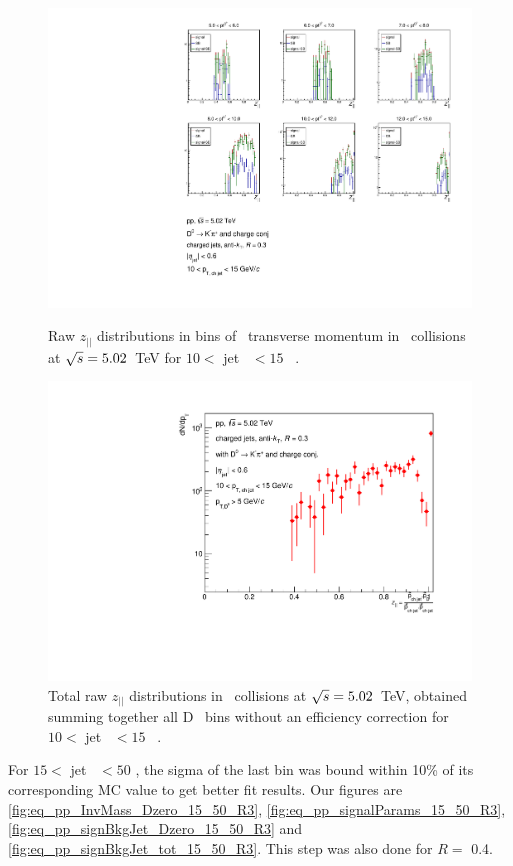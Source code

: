 \begin{figure}[bth]
\centering
\begin{minipage}{.65\textwidth}
  \centering
\includegraphics[width=\textwidth]{pp_2sig/R3_jetbin_10_15/jetRawSpectrum_pTD5}
\caption{Raw $z_{||}$ distributions in bins of \Dzero\ transverse momentum in \pp\ collisions at $\sqrt{s}=5.02$~TeV for $10<$ jet \pt\ $<15$ \GeVc\ .}
\label{fig:eq_pp_signBkgJet_Dzero_10_15_R3}
\end{minipage}%
\begin{minipage}{.4\textwidth}
  \centering
\includegraphics[width=\textwidth]{pp_2sig/R3_jetbin_10_15/jetPtSpectrum_SB_pTD5}
\caption{Total raw $z_{||}$ distributions in \pp\ collisions at $\sqrt{s}=5.02$~TeV, obtained summing together all D \pt\ bins without an efficiency correction for $10<$ jet \pt\ $<15$ \GeVc\ .
}
\label{fig:eq_pp_signBkgJet_tot_10_15_R3}
\end{minipage}
\end{figure}
For $15<$ jet \pt\ $<50$ \GeVc, the sigma of the last bin was bound within 10\% of its corresponding MC value to get better fit results. Our figures are \ref{fig:eq_pp_InvMass_Dzero_15_50_R3}, \ref{fig:eq_pp_signalParams_15_50_R3}, \ref{fig:eq_pp_signBkgJet_Dzero_15_50_R3} and \ref{fig:eq_pp_signBkgJet_tot_15_50_R3}. This step was also done for $R=$ 0.4.

